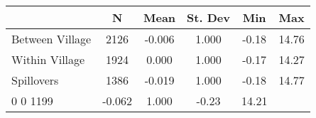 \begin{tabular}{l*{5}{c}}\hline&\multicolumn{1}{c}{N}&\multicolumn{1}{c}{Mean}&\multicolumn{1}{c}{St. Dev}&\multicolumn{1}{c}{Min}&\multicolumn{1}{c}{Max}\\ \hline 
Between Village & 2126 & -0.006 & 1.000 & -0.18 & 14.76 \\
Within Village & 1924 & 0.000 & 1.000 & -0.17 & 14.27 \\
Spillovers & 1386 & -0.019 & 1.000 & -0.18 & 14.77 \\
0 0 1199 & -0.062 & 1.000 & -0.23 & 14.21 \\
\hline \end{tabular}
